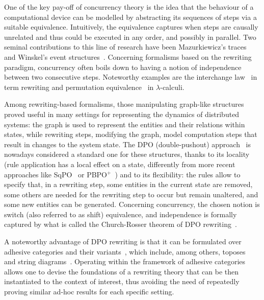 \documentclass[a4paper,UKenglish,cleveref,pdftex,thm-restate,numberwithinsect]{lipics-v2021}
\begin{document}
One of the key pay-off of concurrency theory is the idea that the behaviour of 
a computational device can be modelled by abstracting its sequences of steps
via a suitable equivalence. Intuitively, the equivalence 
captures when 
steps are causally unrelated and thus could be executed in any 
order, and possibly in parallel. 
%
Two seminal contributions to this line of research have been
Mazurkiewicz's traces~\cite{Mazurkiewicz86} and Winskel's event structures~\cite{NPW:PNES}.
%
Concerning formalisms based on the rewriting paradigm,
concurrency often boils down to having a notion of 
independence between two consecutive steps.
Noteworthy examples are the
interchange law~\cite{Mes92} in term rewriting and permutation 
equivalence~\cite{JJL80} in $\lambda$-calculi. 

Among rewriting-based formalisms, those manipulating graph-like
structures proved useful in many settings for representing the
dynamics of distributed systems: the graph is used to represent the
entities and their relations within states, while rewriting steps,
modifying the graph, model computation steps that result in changes to
the system state. The DPO (double-pushout) approach~\cite{EhrigPS73}
is nowadays considered a standard one for these structures, thanks to
its locality (rule application has a local effect on a state,
differently from more recent approaches like
SqPO~\cite{CorradiniHHK06} or PBPO$^+$~\cite{OverbeekER23}) and to its
flexibility: the rules allow to specify that, in a rewriting step,
some entities in the current state are removed, some others are needed
for the rewriting step to occur but remain unaltered, and some new
entities can be generated. Concerning concurrency, the chosen notion
is switch (also referred to as shift) equivalence, and independence is formally captured by what is
called the Church-Rosser theorem of DPO
rewriting~\cite[Chapter 3, Section~3.4]{CorradiniMREHL97}. %

A noteworthy advantage of DPO rewriting is that it can be formulated over
adhesive categories and their variants~\cite{lack2005adhesive,ehrig2006weak}, which include, among others, 
toposes~\cite{johnstone2007quasitoposes} and string
diagrams~\cite{bonchi2022string}.
%
Operating within the framework of adhesive categories allows one to
devise the foundations of a rewriting theory that can be then
instantiated to the context of interest, thus avoiding the need of
repeatedly proving similar ad-hoc results for each specific
setting. %
\end{document}
